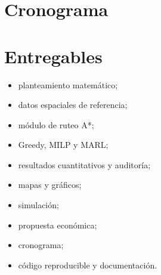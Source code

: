 \section{Cronograma}
\begin{table}[H]
\centering
\caption{Cronograma de seis semanas.}
\scriptsize
{}
\end{table}
\section{Entregables}
\begin{itemize}
\item planteamiento matemático;
\item datos espaciales de referencia;
\item módulo de ruteo A*;
\item Greedy, MILP y MARL;
\item resultados cuantitativos y auditoría;
\item mapas y gráficos;
\item simulación;
\item propuesta económica;
\item cronograma;
\item código reproducible y documentación.
\end{itemize}